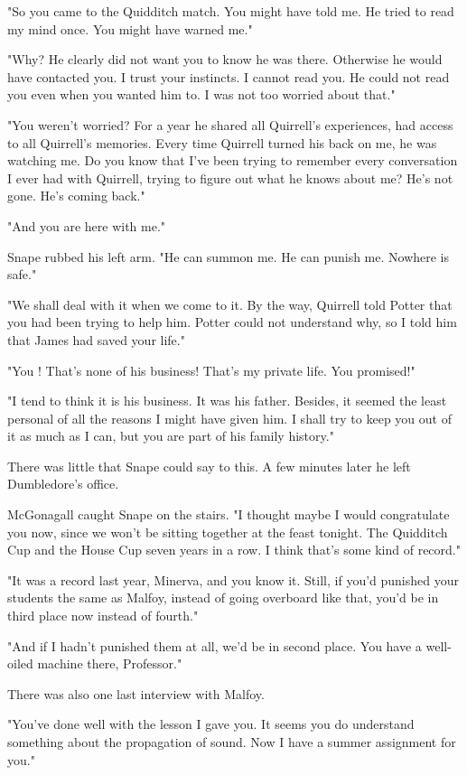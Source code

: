 "So you came to the Quidditch match. You might have told me. He tried to read my mind once. You might have warned me."

"Why? He clearly did not want you to know he was there. Otherwise he would have contacted you. I trust your instincts. I cannot read you. He could not read you even when you wanted him to. I was not too worried about that."

"You weren't worried? For a year he shared all Quirrell's experiences, had access to all Quirrell's memories. Every time Quirrell turned his back on me, he was watching me. Do you know that I've been trying to remember every conversation I ever had with Quirrell, trying to figure out what he knows about me? He's not gone. He's coming back."

"And you are here with me."

Snape rubbed his left arm. "He can summon me. He can punish me. Nowhere is safe."

"We shall deal with it when we come to it. By the way, Quirrell told Potter that you had been trying to help him. Potter could not understand why, so I told him that James had saved your life."

"You{\el} ! That's none of his business! That's my private life. You promised!"

"I tend to think it is his business. It was his father. Besides, it seemed the least personal of all the reasons I might have given him. I shall try to keep you out of it as much as I can, but you are part of his family history."

There was little that Snape could say to this. A few minutes later he left Dumbledore's office.

McGonagall caught Snape on the stairs. "I thought maybe I would congratulate you now, since we won't be sitting together at the feast tonight. The Quidditch Cup and the House Cup seven years in a row. I think that's some kind of record."

"It was a record last year, Minerva, and you know it. Still, if you'd punished your students the same as Malfoy, instead of going overboard like that, you'd be in third place now instead of fourth."

"And if I hadn't punished them at all, we'd be in second place. You have a well-oiled machine there, Professor."

There was also one last interview with Malfoy.

"You've done well with the lesson I gave you. It seems you do understand something about the propagation of sound. Now I have a summer assignment for you."

